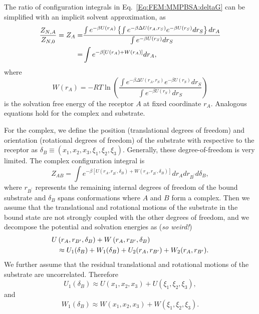 The ratio of configuration integrals in Eq.~\ref{Eq:FEM:MMPBSA:deltaG} can be simplified with an implicit solvent approximation, as
\begin{align}
	\frac{Z_{N,A}}{Z_{N,0}}=Z_A=&\frac{\int e^{-\beta U(r_A)}\left\{\int e^{-\beta\Delta U(r_A,r_S)}e^{-\beta U(r_S)}dr_S\right\}dr_A}{\int e^{-\beta U(r_S)}dr_S}\notag\\
	                           =&\int e^{-\beta \left[U(r_A)+W(r_A)\right]}dr_A,
\end{align}
where
\begin{equation}
	W(r_A)=-RT\ln{\left(\frac{\int e^{-\beta\Delta U(r_A,r_S)}e^{-\beta U(r_S)}dr_S}{\int e^{-\beta U(r_S)}dr_S}\right)}
\end{equation}
is the solvation free energy of the receptor $A$ at fixed coordinate $r_A$. Analogous equations hold for the complex and substrate.

For the complex, we define the position (translational degrees of freedom) and orientation (rotational degrees of freedom) of the substrate with respective to the receptor as $\delta_B\equiv\left(x_1,x_2,x_3,\xi_1,\xi_2,\xi_3\right)$. Generally, these degree-of-freedom is very limited. The complex configuration integral is 
\begin{equation}
	Z_{AB}=\int e^{-\beta\left[U\left(r_A,r_{B^\prime},\delta_B\right)+W\left(r_A,r_{B^\prime},\delta_B\right)\right]}dr_Adr_{B^\prime}d\delta_B,
\end{equation}
where $r_{B^\prime}$ represents the remaining internal degrees of freedom of the bound substrate and $\delta_B$ spans conformations where $A$ and $B$ form a complex. 
Then we assume that the translational and rotational motions of the substrate in the bound state are not strongly coupled with the other degrees of freedom, and we decompose the potential and solvation energies as (\textit{so weird!})
\begin{align}
	U&\left(r_A,r_{B^\prime},\delta_B\right)+W\left(r_A,r_{B^\prime},\delta_B\right)\notag\\
	 &\approx U_1(\delta_B) + W_1(\delta_B) +U_2(r_A,r_{B^\prime})+W_2(r_A,r_{B^\prime}).
\end{align}
We further assume that the residual translational and rotational motions of the substrate are uncorrelated. Therefore
\begin{equation}
	U_1(\delta_B) \approx U(x_1,x_2,x_3) + U(\xi_1,\xi_2,\xi_3),
\end{equation}
and
\begin{equation}
	W_1(\delta_B) \approx W(x_1,x_2,x_3) + W(\xi_1,\xi_2,\xi_3).
\end{equation}

